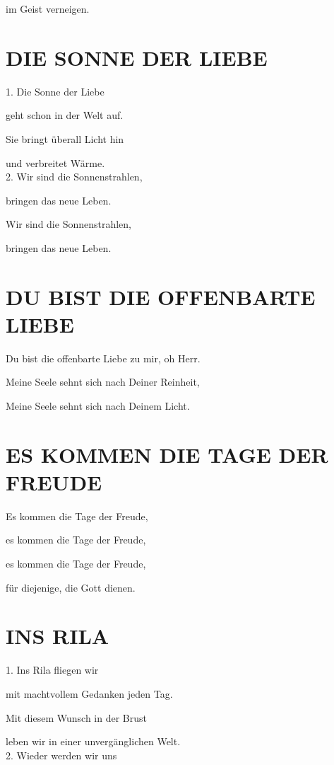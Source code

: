 \documentclass[11pt,a5paper,twoside]{article}
\begin{document}
im Geist verneigen.\\

\section[Die Sonne der Liebe]{DIE SONNE DER LIEBE}

1. Die Sonne der Liebe

geht schon in der Welt auf.

Sie bringt überall Licht hin

und verbreitet Wärme.\\


2. Wir sind die Sonnenstrahlen,

bringen das neue Leben.

Wir sind die Sonnenstrahlen,

bringen das neue Leben.

\section[Du bist die offenbarte Liebe]{DU BIST DIE OFFENBARTE LIEBE}

Du bist die offenbarte Liebe zu mir, oh Herr.

Meine Seele sehnt sich nach Deiner Reinheit,

Meine Seele sehnt sich nach Deinem Licht.

\section[Es kommen die Tage der Freude]{ES KOMMEN DIE TAGE DER FREUDE}

Es kommen die Tage der Freude, 

es kommen die Tage der Freude,

es kommen die Tage der Freude,

für diejenige, die Gott dienen. 

\section[Ins Rila]{INS RILA}

1. Ins Rila fliegen wir 

mit machtvollem Gedanken jeden Tag. 

Mit diesem Wunsch in der Brust
 
leben wir in einer unvergänglichen Welt.\\

2. Wieder werden wir uns
\end{document}
